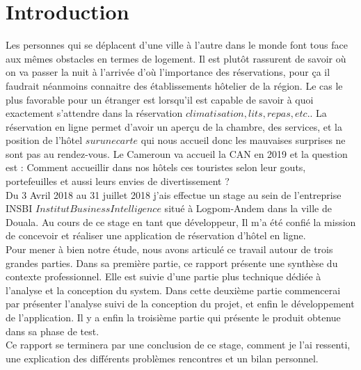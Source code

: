 \chapter*{Introduction}

Les personnes qui se déplacent d’une ville à l’autre dans le monde font tous face aux mêmes obstacles en termes de logement. Il est plutôt rassurent de savoir où on va passer la nuit à l’arrivée d’où l’importance des réservations, pour ça il faudrait néanmoins connaitre des établissements hôtelier de la région. Le cas le plus favorable pour un étranger est lorsqu’il est capable de savoir à quoi exactement s’attendre dans la réservation \(climatisation, lits, repas, etc.\). La réservation en ligne permet d’avoir un aperçu de la chambre, des services, et la position de l’hôtel \(sur une carte\) qui nous accueil donc les mauvaises surprises ne sont pas au rendez-vous. Le Cameroun va accueil la CAN en 2019 et la question est : Comment accueillir dans nos hôtels ces touristes selon leur gouts, portefeuilles et aussi leurs envies de divertissement ?\\

Du 3 Avril 2018 au 31 juillet 2018 j’ais effectue un stage au sein de l’entreprise INSBI \(Institut Business Intelligence\) situé à Logpom-Andem dans la ville de Douala. Au cours de ce stage en tant que développeur, Il m’a été confié la mission de concevoir et réaliser une application de réservation d’hôtel en ligne.\\

Pour mener à bien notre étude, nous avons articulé ce travail autour de trois grandes parties. Dans sa première partie, ce rapport présente une synthèse du contexte professionnel. Elle est suivie d'une partie plus technique dédiée à l’analyse et la conception du system. Dans cette deuxième partie commencerai par présenter l’analyse suivi de la conception du projet, et enfin le développement de l'application. Il y a enfin la troisième partie qui présente le produit obtenue dans sa phase de test.\\


Ce rapport se terminera par une conclusion de ce stage, comment je l'ai ressenti, une explication des différents problèmes rencontres et un bilan personnel.\\
